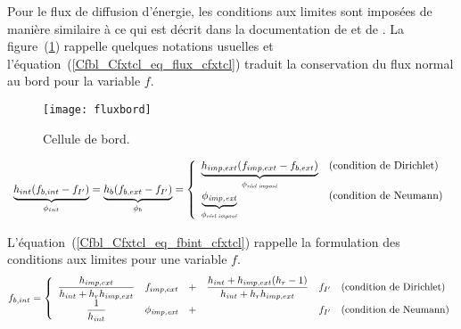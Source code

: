 Pour le flux de diffusion d'énergie, les conditions aux limites sont
imposées de manière similaire à ce qui est décrit dans
la documentation de  et de
. La figure~(\ref{Cfbl_Cfxtcl_fig_flux_cfxtcl}) rappelle quelques notations
usuelles et l'équation~(\ref{Cfbl_Cfxtcl_eq_flux_cfxtcl}) traduit la conservation du flux
normal au bord pour la variable $f$.

\begin{figure}[htp]
\centerline{\texttt{[image: fluxbord]}}
\caption{\label{Cfbl_Cfxtcl_fig_flux_cfxtcl}Cellule de bord.}
\end{figure}

\begin{equation}\label{Cfbl_Cfxtcl_eq_flux_cfxtcl}
\begin{array}{l}
    \underbrace{h_{int}(f_{b,int}-f_{I'})}_{\phi_{int}}
  = \underbrace{h_{b}(f_{b,ext}-f_{I'})}_{\phi_{b}}
  = \left\{\begin{array}{ll}
    \underbrace{h_{imp,ext}(f_{imp,ext}-f_{b,ext})}_{\phi_{\text{\it réel
imposé}}} &\text{(condition de Dirichlet)}\\
    \underbrace{\phi_{\text{\it imp,ext}}}_{\phi_{\text{\it réel imposé}}}
            &\text{(condition de Neumann)}
           \end{array}\right.
\end{array}
\end{equation}


L'équation~(\ref{Cfbl_Cfxtcl_eq_fbint_cfxtcl}) rappelle la formulation des
conditions aux limites pour une variable $f$.
\begin{equation}\label{Cfbl_Cfxtcl_eq_fbint_cfxtcl}
f_{b,int}
  = \left\{\begin{array}{cccccl}
    \displaystyle\frac{h_{imp,ext}}{h_{int}+h_r h_{imp,ext} }&f_{imp,ext}&+&
    \displaystyle\frac{h_{int}+h_{imp,ext}(h_r-1)}{h_{int}+h_r h_{imp,ext} }&f_{I'}
                         &\text{(condition de Dirichlet)}\\
    \displaystyle\frac{1}{h_{int}}&\phi_{\text{\it imp,ext}}&+&
    \ &f_{I'}
            &\text{(condition de Neumann)}
           \end{array}\right.
\end{equation}

